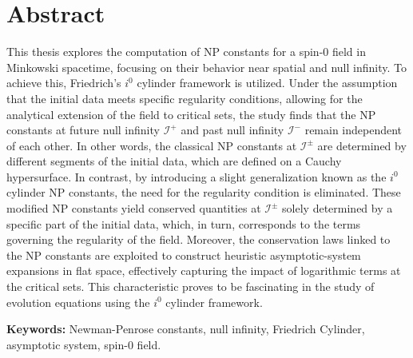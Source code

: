 
\section*{Abstract}


This thesis explores the computation of NP constants for a spin-0 field in Minkowski spacetime, focusing on their behavior near spatial and null infinity. To achieve this, Friedrich's $i^0$ cylinder framework is utilized. Under the assumption that the initial data meets specific regularity conditions, allowing for the analytical extension of the field to critical sets, the study finds that the NP constants at future null infinity $\mathscr{I}^{+}$ and past null infinity $\mathscr{I}^{-}$ remain independent of each other. In other words, the classical NP constants at $\mathscr{I}^{\pm}$ are determined by different segments of the initial data, which are defined on a Cauchy hypersurface.
In contrast, by introducing a slight generalization known as the $i^0$ cylinder NP constants, the need for the regularity condition is eliminated. These modified NP constants yield conserved quantities at $\mathscr{I}^{\pm}$ solely determined by a specific part of the initial data, which, in turn, corresponds to the terms governing the regularity of the field. Moreover, the conservation laws linked to the NP constants are exploited to construct heuristic asymptotic-system expansions in flat space, effectively capturing the impact of logarithmic terms at the critical sets. This characteristic proves to be fascinating in the study of evolution equations using the $i^0$ cylinder framework.

\vfill

\textbf{\Large Keywords:} Newman-Penrose constants, null infinity, Friedrich Cylinder, asymptotic system, spin-0 field.

